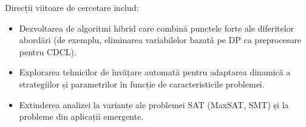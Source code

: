 \documentclass[a4paper,10pt]{article}
\begin{document}
Direcții viitoare de cercetare includ:

\begin{itemize}
    \item Dezvoltarea de algoritmi hibrid care combină punctele forte ale diferitelor abordări (de exemplu, eliminarea variabilelor bazată pe DP ca preprocesare pentru CDCL).
    
    \item Explorarea tehnicilor de învățare automată pentru adaptarea dinamică a strategiilor și parametrilor în funcție de caracteristicile problemei.
    
    \item Extinderea analizei la variante ale problemei SAT (MaxSAT, SMT) și la probleme din aplicații emergente.
\end{itemize}
\end{document}
